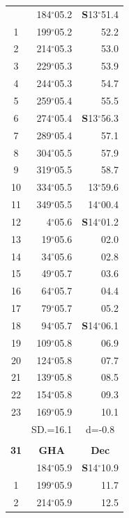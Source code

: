 \documentclass[10pt, a4paper]{report}
\begin{document}
\begin{scriptsize}
\begin{tabular*}{0.2\textwidth}[t]{@{\extracolsep{\fill}}|c|rr|}
\hline\rule{0pt}{2.6ex}\noindent
0 & 184$^\circ$05.2 & \textbf{S}13$^\circ$51.4\\
1 & 199$^\circ$05.2 & 52.2\\
2 & 214$^\circ$05.3 & 53.0\\
3 & 229$^\circ$05.3 & \raisebox{0.24ex}{\boldmath$\cdot$~\boldmath$\cdot$~~}53.9\\
4 & 244$^\circ$05.3 & 54.7\\
5 & 259$^\circ$05.4 & 55.5\\[2Pt]
6 & 274$^\circ$05.4 & \textbf{S}13$^\circ$56.3\\
7 & 289$^\circ$05.4 & 57.1\\
8 & 304$^\circ$05.5 & 57.9\\
9 & 319$^\circ$05.5 & \raisebox{0.24ex}{\boldmath$\cdot$~\boldmath$\cdot$~~}58.7\\
10 & 334$^\circ$05.5 & 13$^\circ$59.6\\
11 & 349$^\circ$05.5 & 14$^\circ$00.4\\[2Pt]
12 & 4$^\circ$05.6 & \textbf{S}14$^\circ$01.2\\
13 & 19$^\circ$05.6 & 02.0\\
14 & 34$^\circ$05.6 & 02.8\\
15 & 49$^\circ$05.7 & \raisebox{0.24ex}{\boldmath$\cdot$~\boldmath$\cdot$~~}03.6\\
16 & 64$^\circ$05.7 & 04.4\\
17 & 79$^\circ$05.7 & 05.2\\[2Pt]
18 & 94$^\circ$05.7 & \textbf{S}14$^\circ$06.1\\
19 & 109$^\circ$05.8 & 06.9\\
20 & 124$^\circ$05.8 & 07.7\\
21 & 139$^\circ$05.8 & \raisebox{0.24ex}{\boldmath$\cdot$~\boldmath$\cdot$~~}08.5\\
22 & 154$^\circ$05.8 & 09.3\\
23 & 169$^\circ$05.9 & 10.1\\
\hline
\rule{0pt}{2.4ex} & \multicolumn{1}{c}{SD.=16.1} & \multicolumn{1}{c|}{d=-0.8}\\
\hline
\multicolumn{1}{c}{}\\[-0.5ex]\hline
\multicolumn{1}{|c|}{\rule{0pt}{2.6ex}\textbf{31}} & \multicolumn{1}{c}{\textbf{GHA}} & \multicolumn{1}{c|}{\textbf{Dec}}\\
\hline\rule{0pt}{2.6ex}\noindent
0 & 184$^\circ$05.9 & \textbf{S}14$^\circ$10.9\\
1 & 199$^\circ$05.9 & 11.7\\
2 & 214$^\circ$05.9 & 12.5\\

\end{tabular*}
\end{scriptsize}
\end{document}
